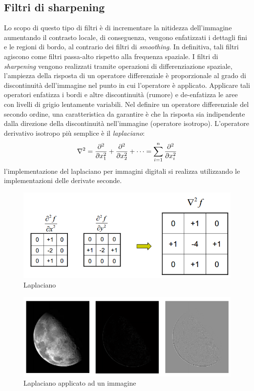 \subsection{Filtri di sharpening}
Lo scopo di questo tipo di filtri è di incrementare la nitidezza dell'immagine 
aumentando il contrasto locale, di conseguenza, vengono enfatizzati i 
dettagli fini e le regioni di bordo, al contrario 
dei filtri di \emph{smoothing}. In definitiva, tali filtri agiscono come filtri 
passa-alto rispetto alla frequenza spaziale.
I filtri di \emph{sharpening} vengono realizzati tramite operazioni di 
differenziazione spaziale, l'ampiezza della risposta di un operatore 
differenziale è proporzionale al grado di discontinuità dell'immagine nel punto in cui 
l'operatore è applicato. Applicare tali operatori enfatizza i 
bordi e altre discontinuità (rumore) e de-enfatizza le aree con livelli di grigio
lentamente variabili.
Nel definire un operatore differenziale del secondo  ordine, una
caratteristica da garantire è che la  risposta sia indipendente dalla
direzione della  discontinuità nell'immagine (operatore isotropo).
L'operatore derivativo isotropo più semplice è il  \emph{laplaciano}:
\[
\nabla^2 = {\partial^2 \over \partial x^2_1 } + {\partial^2 \over \partial x^2_2 } + \dots = \sum_{i=1}^n \frac {\partial^2}{\partial x^2_i}
\]
l'implementazione del laplaciano per  immagini digitali si realizza
utilizzando le  implementazioni delle derivate seconde.
\begin{figure}[h]
\centering
\includegraphics[width=.5\textwidth]{img/laplaciano.png}
\caption{Laplaciano}
\label{fig:laplaciano}
\end{figure}
\begin{figure}[h]
\centering
\includegraphics[width=.8\textwidth]{img/laplaciano-applicato.png}
\caption{Laplaciano applicato ad un immagine}
\label{fig:laplaciano-applicato}
\end{figure}


